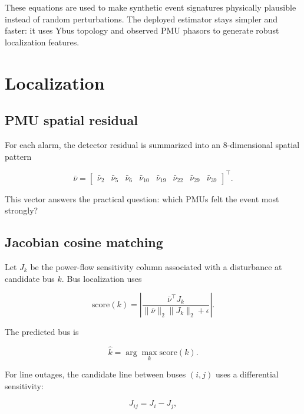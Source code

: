 \documentclass[11pt]{article}
\begin{document}
These equations are used to make synthetic event signatures physically plausible
instead of random perturbations. The deployed estimator stays simpler and faster:
it uses Ybus topology and observed PMU phasors to generate robust localization
features.

\section{Localization}

\subsection{PMU spatial residual}

For each alarm, the detector residual is summarized into an 8-dimensional spatial
pattern

\begin{equation}
  \bar{\nu} =
  \begin{bmatrix}
    \bar{\nu}_2 & \bar{\nu}_5 & \bar{\nu}_6 & \bar{\nu}_{10} &
    \bar{\nu}_{19} & \bar{\nu}_{22} & \bar{\nu}_{29} & \bar{\nu}_{39}
  \end{bmatrix}^{\top}.
\end{equation}

This vector answers the practical question: which PMUs felt the event most
strongly?

\subsection{Jacobian cosine matching}

Let $J_k$ be the power-flow sensitivity column associated with a disturbance at
candidate bus $k$. Bus localization uses

\begin{equation}
  \mathrm{score}(k) =
  \left|
  \frac{\bar{\nu}^{\top}J_k}
       {\|\bar{\nu}\|_2\|J_k\|_2+\epsilon}
  \right|.
\end{equation}

The predicted bus is

\begin{equation}
  \hat{k} = \arg\max_k \mathrm{score}(k).
\end{equation}

For line outages, the candidate line between buses $(i,j)$ uses a differential
sensitivity:

\begin{equation}
  J_{ij} = J_i - J_j,
\end{equation}
\end{document}
